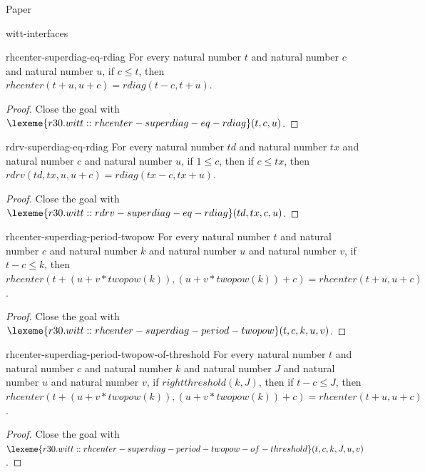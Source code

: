 \begin{lexlean}{Paper}
\begin{section}{witt-interfaces}
  \begin{theorem}{rhcenter-superdiag-eq-rdiag}
  For every natural number \(t\) and natural number \(c\) and natural number \(u\), if \(c ≤ t\), then \(rhcenter(t + u, u + c) = rdiag(t - c, t + u)\).
  \begin{proof}
  Close the goal with \(\lexeme{r30.witt::rhcenter-superdiag-eq-rdiag}(t, c, u)\).
  \end{proof}
  \end{theorem}

  \begin{theorem}{rdrv-superdiag-eq-rdiag}
  For every natural number \(td\) and natural number \(tx\) and natural number \(c\) and natural number \(u\), if \(1 ≤ c\), then if \(c ≤ tx\), then \(rdrv(td, tx, u, u + c) = rdiag(tx - c, tx + u)\).
  \begin{proof}
  Close the goal with \(\lexeme{r30.witt::rdrv-superdiag-eq-rdiag}(td, tx, c, u)\).
  \end{proof}
  \end{theorem}

  \begin{theorem}{rhcenter-superdiag-period-twopow}
  For every natural number \(t\) and natural number \(c\) and natural number \(k\) and natural number \(u\) and natural number \(v\), if \(t - c ≤ k\), then \(rhcenter(t + (u + v * twopow(k)), (u + v * twopow(k)) + c) = rhcenter(t + u, u + c)\).
  \begin{proof}
  Close the goal with \(\lexeme{r30.witt::rhcenter-superdiag-period-twopow}(t, c, k, u, v)\).
  \end{proof}
  \end{theorem}

  \begin{theorem}{rhcenter-superdiag-period-twopow-of-threshold}
  For every natural number \(t\) and natural number \(c\) and natural number \(k\) and natural number \(J\) and natural number \(u\) and natural number \(v\), if \(rightthreshold(k, J)\), then if \(t - c ≤ J\), then \(rhcenter(t + (u + v * twopow(k)), (u + v * twopow(k)) + c) = rhcenter(t + u, u + c)\).
  \begin{proof}
  Close the goal with \(\lexeme{r30.witt::rhcenter-superdiag-period-twopow-of-threshold}(t, c, k, J, u, v)\).
  \end{proof}
  \end{theorem}


\end{section}
\end{lexlean}
